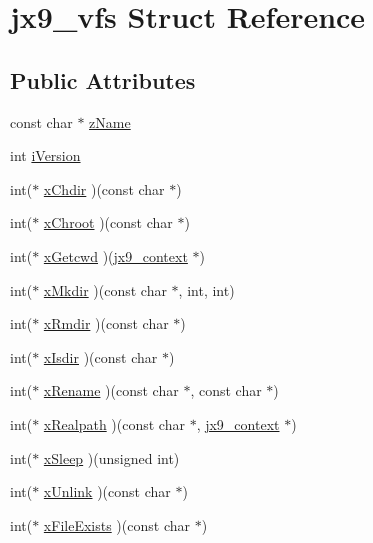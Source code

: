 \hypertarget{structjx9__vfs}{\section{jx9\-\_\-vfs Struct Reference}
\label{da/d75/structjx9__vfs}
}
\subsection*{Public Attributes}
\begin{DoxyCompactItemize}
\item 
const char $\ast$ \hyperlink{structjx9__vfs_afa478797c8306350b3aac8d980057f4a}{z\-Name}
\item 
int \hyperlink{structjx9__vfs_a2eee63a849ff3f77c2a903e613c003b6}{i\-Version}
\item 
int($\ast$ \hyperlink{structjx9__vfs_ab044f9cb336dbc8d93b10f9738cbf8fa}{x\-Chdir} )(const char $\ast$)
\item 
int($\ast$ \hyperlink{structjx9__vfs_a3227006c94d5ae22addc36918ec555c0}{x\-Chroot} )(const char $\ast$)
\item 
int($\ast$ \hyperlink{structjx9__vfs_a624d05f161753930b74983f0f3a8598e}{x\-Getcwd} )(\hyperlink{structjx9__context}{jx9\-\_\-context} $\ast$)
\item 
int($\ast$ \hyperlink{structjx9__vfs_a6dcbf7acc6e0b8143a09c95975888bd0}{x\-Mkdir} )(const char $\ast$, int, int)
\item 
int($\ast$ \hyperlink{structjx9__vfs_aa4f4f0ad5049e858afeda247ca9bdc10}{x\-Rmdir} )(const char $\ast$)
\item 
int($\ast$ \hyperlink{structjx9__vfs_afe0da137298de6c6613fbf0f8dd00746}{x\-Isdir} )(const char $\ast$)
\item 
int($\ast$ \hyperlink{structjx9__vfs_a076ad5ae9eb89d2369c4d9b99393febf}{x\-Rename} )(const char $\ast$, const char $\ast$)
\item 
int($\ast$ \hyperlink{structjx9__vfs_a11d4a7866eb86ca4fa23eb2c27733777}{x\-Realpath} )(const char $\ast$, \hyperlink{structjx9__context}{jx9\-\_\-context} $\ast$)
\item 
int($\ast$ \hyperlink{structjx9__vfs_aa3cd1ef555e39fe9ce2abb2877e850a7}{x\-Sleep} )(unsigned int)
\item 
int($\ast$ \hyperlink{structjx9__vfs_a121bf9faca9e0eddc65390c784659a81}{x\-Unlink} )(const char $\ast$)
\item 
int($\ast$ \hyperlink{structjx9__vfs_a387bdd567e04be4df82b4a8e99db8a35}{x\-File\-Exists} )(const char $\ast$)
\item 

\end{DoxyCompactItemize}
